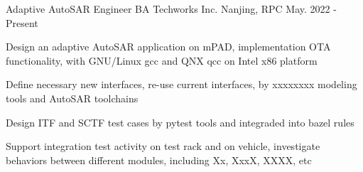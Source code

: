 

\begin{cventries}

  \cventry
    {Adaptive AutoSAR Engineer} %
    {BA Techworks Inc.} %
    {Nanjing, RPC} %
    {May. 2022 - Present} %
    {
      \begin{cvitems} %
        \item {Design an adaptive AutoSAR application on mPAD, implementation OTA functionality, with GNU/Linux gcc and QNX qcc on Intel x86 platform}
        \item {Define necessary new interfaces, re-use current interfaces, by xxxxxxxx modeling tools and AutoSAR toolchains}
        \item {Design ITF and SCTF test cases by pytest tools and integraded into bazel rules}
        \item {Support integration test activity on test rack and on vehicle, investigate behaviors between different modules, including Xx, XxxX, XXXX, etc}
      \end{cvitems}
    }


\end{cventries}
